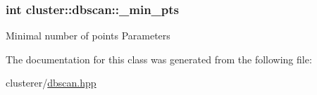 \subsubsection[{\+\_\+min\+\_\+pts}]{\setlength{\rightskip}{0pt plus 5cm}int cluster\+::dbscan\+::\+\_\+min\+\_\+pts\hspace{0.3cm}{\ttfamily [protected]}}\label{classcluster_1_1dbscan_aaf6a0241678a63592356ab8e150ee511}
Minimal number of points Parameters 

The documentation for this class was generated from the following file\+:\begin{DoxyCompactItemize}
\item 
clusterer/\hyperlink{dbscan_8hpp}{dbscan.\+hpp}\end{DoxyCompactItemize}
